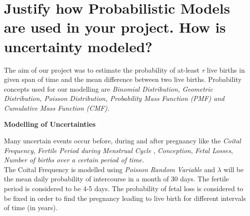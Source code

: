 \documentclass{article}
\begin{document}
\section {Justify how Probabilistic Models are used in your project. How is uncertainty modeled?}
The aim of our project was to estimate the probability of at-least {\slshape r} live births in given span of time and the mean difference between two live births. Probability concepts used for our modelling are {\slshape Binomial Distribution, Geometric Distribution, Poisson Distribution, Probability Mass Function (PMF) and Cumulative Mass Function (CMF).}
%
\begin{center}
	{\large {\bfseries Modelling of Uncertainties}}
\end{center}
Many uncertain events occur before, during and after pregnancy like the {\slshape Coital Frequency}, {\slshape Fertile Period during Menstrual Cycle} , {\slshape Conception}, {\slshape Fetal Losses}, {\slshape Number of births over a certain period of time.}\\

The Coital Frequency is modelled using {\slshape Poisson Random Variable} and {\slshape $\lambda$} will be the mean daily probability of intercourse in a month of 30 days. The fertile period is considered to be 4-5 days. The probability of fetal loss is considered to be fixed in order to find the pregnancy leading to live birth for different intervals of time (in years).\\
\end{document}
